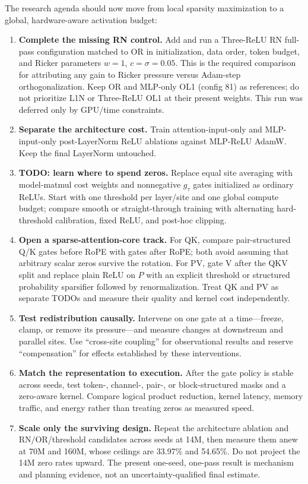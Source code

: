 \documentclass[10pt]{article}
\newcommand{\pct}{\%}
\begin{document}
The research agenda should now move from local sparsity maximization to a global, hardware-aware activation budget:
\begin{enumerate}
  \item \textbf{Complete the missing RN control.} Add and run a Three-ReLU RN full-pass configuration matched to OR in initialization, data order, token budget, and Ricker parameters $w=1$, $c=\sigma=0.05$. This is the required comparison for attributing any gain to Ricker pressure versus Adam-step orthogonalization. Keep OR and MLP-only OL1 (config 81) as references; do not prioritize L1N or Three-ReLU OL1 at their present weights. This run was deferred only by GPU/time constraints.
  \item \textbf{Separate the architecture cost.} Train attention-input-only and MLP-input-only post-LayerNorm ReLU ablations against MLP-ReLU AdamW. Keep the final LayerNorm untouched.
  \item \textbf{TODO: learn where to spend zeros.} Replace equal site averaging with model-matmul cost weights and nonnegative $g_{\tau}$ gates initialized as ordinary ReLUs. Start with one threshold per layer/site and one global compute budget; compare smooth or straight-through training with alternating hard-threshold calibration, fixed ReLU, and post-hoc clipping.
  \item \textbf{Open a sparse-attention-core track.} For QK, compare pair-structured Q/K gates before RoPE with gates after RoPE; both avoid assuming that arbitrary scalar zeros survive the rotation. For PV, gate V after the QKV split and replace plain ReLU on $P$ with an explicit threshold or structured probability sparsifier followed by renormalization. Treat QK and PV as separate TODOs and measure their quality and kernel cost independently.
  \item \textbf{Test redistribution causally.} Intervene on one gate at a time---freeze, clamp, or remove its pressure---and measure changes at downstream and parallel sites. Use ``cross-site coupling'' for observational results and reserve ``compensation'' for effects established by these interventions.
  \item \textbf{Match the representation to execution.} After the gate policy is stable across seeds, test token-, channel-, pair-, or block-structured masks and a zero-aware kernel. Compare logical product reduction, kernel latency, memory traffic, and energy rather than treating zeros as measured speed.
  \item \textbf{Scale only the surviving design.} Repeat the architecture ablation and RN/OR/threshold candidates across seeds at 14M, then measure them anew at 70M and 160M, whose ceilings are 33.97\pct{} and 54.65\pct{}. Do not project the 14M zero rates upward. The present one-seed, one-pass result is mechanism and planning evidence, not an uncertainty-qualified final estimate.
\end{enumerate}
\end{document}
